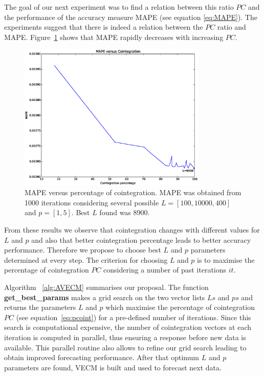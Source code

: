The goal of our next experiment was to find a relation between this ratio
$PC$ and the performance of the accuracy measure MAPE (see equation 
\ref{eq:MAPE}). 
The experiments suggest that there is indeed a relation between the $PC$ ratio
and MAPE.
Figure~\ref{fig:cointvsmape} shows that MAPE rapidly decreases with increasing
$PC$.

\begin{figure}[!h]
  \centering
  \includegraphics[width=0.8\textwidth]{img/MAPEvsCoint-offset21600-p-2-freq-10s}
  \caption{MAPE versus percentage of cointegration. MAPE was obtained from 1000
  iterations considering several possible $L=[100,10000,400]$ and $p=[1,5]$.
  Best $L$ found was 8900.}
  \label{fig:cointvsmape}
\end{figure}

From these results we observe that cointegration changes with different values
for $L$ and $p$ and also that better cointegration percentage leads to better
accuracy performance.
Therefore we propose to choose best $L$ and $p$ parameters determined at every
step. 
The criterion for choosing $L$ and $p$ is to maximise the percentage of
cointegration $PC$ considering a number of past iterations $it$.

Algorithm ~\ref{alg:AVECM} summarises our proposal. 
The function {\bf get\_best\_params} makes a grid search on the two vector
lists $Ls$ and $ps$ and returns the parameters $L$ and $p$ which maximise
the percentage of cointegration $PC$ (see equation~\ref{eq:pcoint}) for a
pre-defined number of iterations.
Since this search is computational expensive, the number of cointegration
vectors at each iteration is computed in parallel, thus ensuring a response
before new data is available. 
This parallel routine also allows to refine our grid search leading to obtain
improved forecasting performance.
After that optimum $L$ and $p$ parameters are found, VECM is built and used
to forecast next data.

